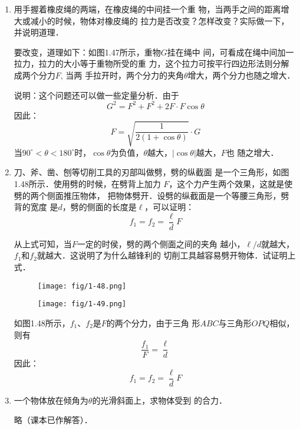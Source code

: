 \begin{enumerate}
\item   用手握着橡皮绳的两端，在橡皮绳的中间挂一个重
物，当两手之间的距离增大或减小的时候，物体对橡皮绳的
拉力是否改变？怎样改变？实际做一下，并说明道理．


\begin{solution}
    要改变，道理如下：如图1.47所示，重物$G$挂在绳中
    间，可看成在绳中间加一拉力，拉力的大小等于重物所受的重
    力，这个拉力可按平行四边形法则分解成两个分力$F$, 当两
    手拉开时，两个分力的夹角$\theta$增大，两个分力也随之增大．

    说明：这个问题还可以做一些定量分析．由于
    \[G^2=F^2+F^2+2F\cdot F\cos\theta\]
    因此：
    \[F=\sqrt{\frac{1}{2(1+\cos\theta)}}\cdot G\]
    当$90^{\circ}<\theta<180^{\circ}$时，$\cos\theta$为负值，$\theta$越大，$|\cos\theta|$越大，$F$也
    随之增大．
\end{solution}
\item  刀、斧、凿、刨等切削工具的刃部叫做劈，劈的纵截面
是一个三角形，如图1.48所示．使用劈的时候，在劈背上加力
$F$，这个力产生两个效果，这就是使劈的两个侧面推压物体，
把物体劈开．设劈的纵截面是一个等腰三角形，劈背的宽度
是$d$，劈的侧面的长度是$\ell$，可以证明：
\[f_1=f_2=\frac{\ell}{d}F \]

从上式可知，当$F$一定的时侯，劈的两个侧面之间的夹角
越小，$\ell/d$就越大，$f_1$和$f_2$就越大．这说明了为什么越锋利的
切削工具越容易劈开物体．试证明上式．
\begin{figure}[htp]\centering
    \begin{minipage}[t]{0.48\textwidth}
    \centering
\texttt{[image: fig/1-48.png]}
    \caption{}
    \end{minipage}
    \begin{minipage}[t]{0.48\textwidth}
    \centering
    \texttt{[image: fig/1-49.png]}
    \caption{}
    \end{minipage}
    \end{figure}


\begin{solution}
    如图1.48所示，$f_1$、$f_2$是$F$的两个分力，由于三角
    形$ABC$与三角形$OPQ$相似，则有
\[\frac{f_1}{F}=\frac{\ell}{d}\]
因此：\[f_1=f_2=\frac{\ell}{d}F\]
\end{solution}


\item 一个物体放在倾角为$\theta$的光滑斜面上，求物体受到
的合力．

\begin{solution}
    略（课本已作解答）．
\end{solution}
   


\end{enumerate}
